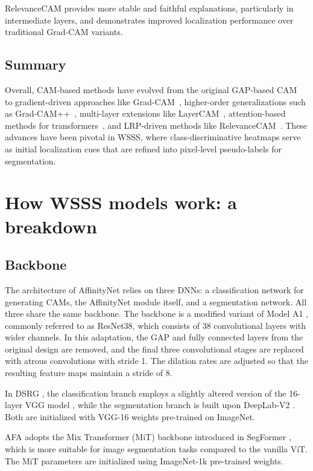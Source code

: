 RelevanceCAM provides more stable and faithful explanations, particularly in intermediate layers, and demonstrates improved localization performance over traditional Grad-CAM variants.

\subsection{Summary}
Overall, CAM-based methods have evolved from the original GAP-based CAM~\cite{cam} to gradient-driven approaches like Grad-CAM~\cite{cam_grad}, higher-order generalizations such as Grad-CAM++~\cite{cam_gradpp}, multi-layer extensions like LayerCAM~\cite{layer_cam}, attention-based methods for transformers~\cite{attention_rollout}, and LRP-driven methods like RelevanceCAM~\cite{relevance_cam}. These advances have been pivotal in WSSS, where class-discriminative heatmaps serve as initial localization cues that are refined into pixel-level pseudo-labels for segmentation.

\section{How WSSS models work: a breakdown}
\label{sec:how-wsss-models-work}

\subsection{Backbone}
\label{subsec:backbone}

The architecture of AffinityNet \cite{wsss_affinitynet} relies on three DNNs: a classification network for generating CAMs, the AffinityNet module itself, and a segmentation network. All three share the same backbone. The backbone is a modified variant of Model A1 \cite{RevisitingResNET}, commonly referred to as ResNet38, which consists of 38 convolutional layers with wider channels. In this adaptation, the GAP and fully connected layers from the original design are removed, and the final three convolutional stages are replaced with atrous convolutions with stride 1. The dilation rates are adjusted so that the resulting feature maps maintain a stride of 8.

In DSRG \cite{wsss_dsrg_deep_seeded_region_growing}, the classification branch employs a slightly altered version of the 16-layer VGG model \cite{VGG16}, while the segmentation branch is built upon DeepLab-V2 \cite{fsss_deeplabv2}. Both are initialized with VGG-16 weights pre-trained on ImageNet.

AFA \cite{wsss_afa_affinity_from_attention} adopts the Mix Transformer (MiT) backbone introduced in SegFormer \cite{fsss_segformer}, which is more suitable for image segmentation tasks compared to the vanilla ViT. The MiT parameters are initialized using ImageNet-1k pre-trained weights.

